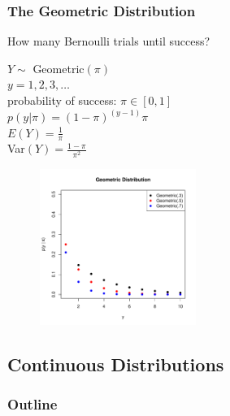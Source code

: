 \documentclass{beamer}
\begin{document}
\begin{frame}
\frametitle{The Geometric Distribution}
\pause
How many Bernoulli trials until success?
\begin{multicols}{2}
\pause
$Y \sim$ Geometric$(\pi)$\\
\bigskip
\pause
$y = 1,2,3,\dots$\\
\bigskip
\pause
probability of success: $\pi \in [0,1]$\\
\bigskip
\pause
$p(y|\pi) = (1 - \pi)^{(y-1)} \pi$\\
\bigskip
\bigskip
\pause
$E(Y) = \frac{1}{\pi}$\\
\bigskip
\pause
Var$(Y) = \frac{1 - \pi}{\pi^2}$
\pause


\begin{figure}[!htp]
\begin{center}
\includegraphics[width=2in, height=2in]{probability-geometric.pdf}
\end{center}
\end{figure}
\end{multicols}
\end{frame}

\subsection{Continuous Distributions}


\begin{frame}
\frametitle{Outline}
\tableofcontents[currentsubsection]
\end{frame}
\end{document}
